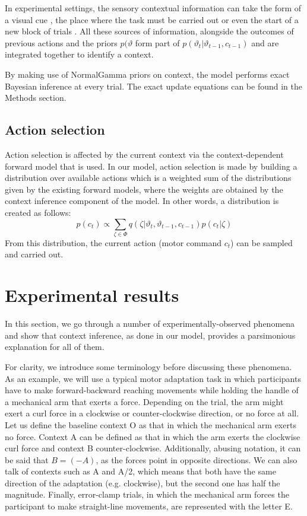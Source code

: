 \documentclass[a4paper,doc,floatsintext,natbib]{apa6}
\begin{document}
In experimental settings, the sensory contextual information can take the form of a visual cue \cite[e.g.][]{Lee_Dual_2009,Kim_Neural_2015}, the place where the task must be carried out \cite[e.g.][]{Forano_Timescales_2020} or even the start of a new block of trials \cite{Ethier_Spontaneous_2008}. All these sources of information, alongside the outcomes of previous actions and the priors $p(\vartheta$ form part of $p(\vartheta_t | \vartheta_{t-1}, c_{t-1})$ and are integrated together to identify a context.

By making use of NormalGamma priors on context, the model performs exact Bayesian inference at every trial. The exact update equations can be found in the Methods section.

\subsection{Action selection}
Action selection is affected by the current context via the context-dependent forward model that is used. In our model, action selection is made by building a distribution over available actions which is a weighted sum of the distributions given by the existing forward models, where the weights are obtained by the context inference component of the model. In other words, a distribution is created as follows:
\begin{equation}
p(c_t) \propto \displaystyle\sum_{\zeta \in \Phi}q(\zeta | \vartheta_t, \vartheta_{t-1}, c_{t-1}) p(c_t | \zeta)
\end{equation}
From this distribution, the current action (motor command $c_t$) can be sampled and carried out.

\section{Experimental results}
In this section, we go through a number of experimentally-observed phenomena and show that context inference, as done in our model, provides a parsimonious explanation for all of them.

For clarity, we introduce some terminology before discussing these phenomena. As an example, we will use a typical motor adaptation task in which participants have to make forward-backward reaching movements while holding the handle of a mechanical arm that exerts a force. Depending on the trial, the arm might exert a curl force in a clockwise or counter-clockwise direction, or no force at all. Let us define the baseline context O as that in which the mechanical arm exerts no force. Context A can be defined as that in which the arm exerts the clockwise curl force and context B counter-clockwise. Additionally, abusing notation, it can be said that $B = (-A)$, as the forces point in opposite directions. We can also talk of contexts such as A and A/2, which means that both have the same direction of the adaptation (e.g. clockwise), but the second one has half the magnitude. Finally, error-clamp trials, in which the mechanical arm forces the participant to make straight-line movements, are represented with the letter E.
\end{document}
